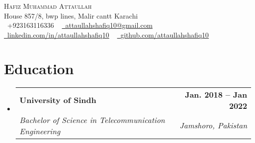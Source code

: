 \documentclass[letterpaper,11pt]{article}
\makeatletter
\newcommand{\resumeSubheading}[4]{
  \vspace{-2pt}\item
    \begin{tabular*}{1.0\textwidth}[t]{l@{\extracolsep{\fill}}r}
      \textbf{#1} & \textbf{\small #2} \\
      \textit{\small#3} & \textit{\small #4} \\
    \end{tabular*}\vspace{-7pt}
}
\newcommand{\resumeSubHeadingListStart}{\begin{itemize}[leftmargin=0.0in, label={}]}
\newcommand{\resumeSubHeadingListEnd}{\end{itemize}}
\makeatother
\begin{document}

\begin{center}
    {\Huge \scshape Hafiz Muhammad Attaullah} \\ \vspace{1pt}
    House 857/8, bwp lines, Malir cantt Karachi \\ \vspace{1pt}
    \small \raisebox{-0.1\height}\faPhone\ +923163116336 ~ \href{mailto:x@gmail.com}{\raisebox{-0.2\height}\faEnvelope\  \underline{attaullahshafiq10@gmail.com}} ~ 
    \href{https://linkedin.com/in//}{\raisebox{-0.2\height}\faLinkedin\ \underline{linkedin.com/in/attaullahshafiq10}}  ~
    \href{https://github.com/}{\raisebox{-0.2\height}\faGithub\ \underline{github.com/attaullahshafiq10}}
    \vspace{-8pt}
\end{center}


\section{Education}
  \resumeSubHeadingListStart
    \resumeSubheading
      {University of Sindh}{Jan. 2018 -- Jan 2022}
      {Bachelor of Science in Telecommunication Engineering}{Jamshoro, Pakistan}
  \resumeSubHeadingListEnd

\end{document}
